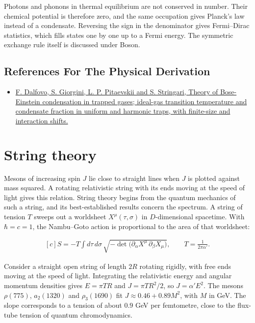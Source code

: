 \documentclass[11pt,oneside]{book}
\newenvironment{centeredalign}{\[\begin{gathered}[c]}{\end{gathered}\]}
\begin{document}
Photons and phonons in thermal equilibrium are not conserved in number. Their chemical potential is therefore zero, and the same occupation gives Planck's law instead of a condensate. Reversing the sign in the denominator gives Fermi--Dirac statistics, which fills states one by one up to a Fermi energy. The symmetric exchange rule itself is discussed under Boson.

\subsection*{References For The Physical Derivation}
\begin{itemize}
\item \href{https://arxiv.org/abs/cond-mat/9806038}{F. Dalfovo, S. Giorgini, L. P. Pitaevskii and S. Stringari, Theory of Bose-Einstein condensation in trapped gases; ideal-gas transition temperature and condensate fraction in uniform and harmonic traps, with finite-size and interaction shifts.}
\end{itemize}





\clearpage

\section{String theory}

\label{topic:string-theory}

Mesons of increasing spin \(J\) lie close to straight lines when \(J\) is plotted against mass squared. A rotating relativistic string with its ends moving at the speed of light gives this relation. String theory begins from the quantum mechanics of such a string, and its best-established results concern the spectrum. A string of tension \(T\) sweeps out a worldsheet \(X^\mu(\tau,\sigma)\) in \(D\)-dimensional spacetime. With \(\hbar=c=1\), the Nambu--Goto action is proportional to the area of that worldsheet:

\begin{centeredalign}
S=-T\int d\tau\,d\sigma\,\sqrt{-\det\big(\partial_\alpha X^\mu\,\partial_\beta X_\mu\big)},\qquad
T=\frac{1}{2\pi\alpha'}.
\end{centeredalign}

Consider a straight open string of length \(2R\) rotating rigidly, with free ends moving at the speed of light. Integrating the relativistic energy and angular momentum densities gives \(E=\pi TR\) and \(J=\pi TR^2/2\), so \(J=\alpha'E^2\). The mesons \(\rho(775)\), \(a_2(1320)\) and \(\rho_3(1690)\) fit \(J\approx0.46+0.89M^2\), with \(M\) in GeV. The slope corresponds to a tension of about \(0.9\) GeV per femtometre, close to the flux-tube tension of quantum chromodynamics.
\end{document}
